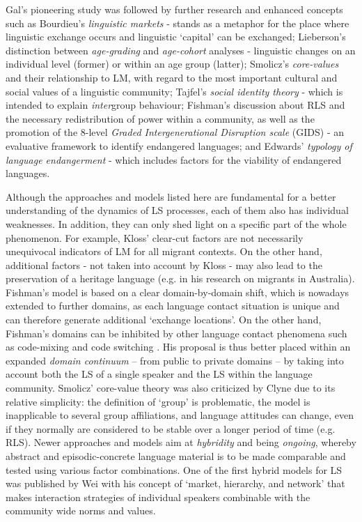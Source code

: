 \documentclass[output=paper,
modfonts
]{langscibook}
\begin{document}
Gal's pioneering study was followed by further research and enhanced concepts such as Bourdieu's \parencite*{Bourdieu1977, Bourdieu1982} \emph{linguistic markets} - stands as a metaphor for the place where linguistic exchange occurs and linguistic ‘capital' can be exchanged; Lieberson's \parencite*{Lieberson1980} distinction between \emph{age-grading} and \emph{age-cohort} analyses - linguistic changes on an individual level (former) or within an age group (latter); Smolicz's \parencite*{Smolicz1980} \emph{core-values} and their relationship to LM, with regard to the most important cultural and social values of a linguistic community; Tajfel's \parencite*{Tajfel1981} \emph{social identity theory} - which is intended to explain \emph{inter}group behaviour; Fishman's \parencite*{Fishman1991} discussion about RLS and the necessary redistribution of power within a community, as well as the promotion of the 8-level \textit{Graded Intergenerational Disruption scale} (GIDS) - an evaluative framework to identify endangered languages; and Edwards' \parencite*{Edwards1992} \emph{typology of language endangerment} - which includes factors for the viability of endangered languages.

Although the approaches and models listed here are fundamental for a better understanding of the dynamics of LS processes, each of them also has individual weaknesses. In addition, they can only shed light on a specific part of the whole phenomenon. For example, Kloss' \parencite*{Kloss1966} clear-cut factors are not necessarily unequivocal indicators of LM for all migrant contexts. On the other hand, additional factors - not taken into account by Kloss - may also lead to the preservation of a heritage language (e.g. \citealt{Clyne1991}  in his research on migrants in Australia). Fishman's \parencite*{Fishman1972} model is based on a clear domain-by-domain shift, which is nowadays extended to further domains, as each language contact situation is unique and can therefore generate additional ‘exchange locations'. On the other hand, Fishman's domains can be inhibited by other language contact phenomena such as code-mixing and code switching
. His proposal is thus better placed within an expanded \emph{domain continuum} -- from public to private domains -- by taking into account both the LS of a single speaker and the LS within the language community. Smolicz' \parencite*{Smolicz1980} core-value theory was also criticized by Clyne \parencite*{Clyne1991} due to its relative simplicity: the definition of ‘group' is problematic, the model is inapplicable to several group affiliations, and language attitudes can change, even if they normally are considered to be stable over a longer period of time (e.g. RLS). Newer approaches and models aim at \emph{hybridity} and being \emph{ongoing}, whereby abstract and episodic-concrete language material is to be made comparable and tested using various factor combinations. One of the first hybrid models for LS was published by Wei \parencite*{Wei2002} with his concept of ‘market, hierarchy, and network' that makes interaction strategies of individual speakers combinable with the community wide norms and values.
\end{document}
